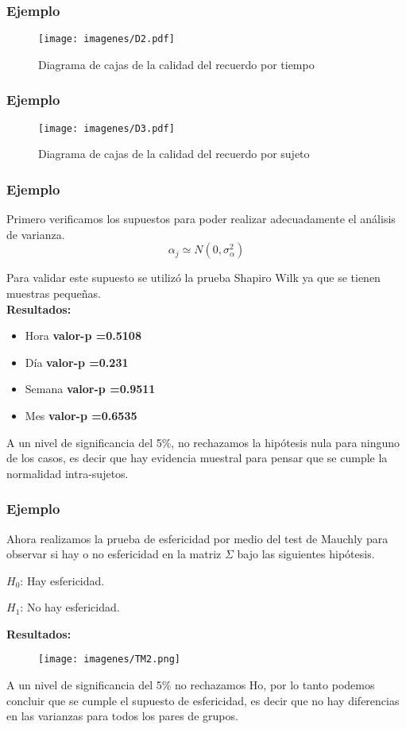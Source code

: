 \documentclass[12pt]{beamer}
\begin{document}
\begin{frame}
\frametitle{Ejemplo}
\begin{figure}[h!]
\caption{Diagrama de cajas de la calidad del recuerdo por tiempo}
  \centering
  \texttt{[image: imagenes/D2.pdf]}
\end{figure}
\end{frame}

\begin{frame}
\frametitle{Ejemplo}
\begin{figure}[h!]
\caption{Diagrama de cajas de la calidad del recuerdo por sujeto}
  \centering
  \texttt{[image: imagenes/D3.pdf]}
\end{figure}
\end{frame}

\begin{frame}
\frametitle{Ejemplo}
Primero verificamos los supuestos para poder realizar adecuadamente el análisis de varianza. 
 $$\alpha_j \simeq N(0,\sigma^2_\alpha)$$

Para validar este supuesto se utilizó la prueba Shapiro Wilk ya que se tienen muestras pequeñas.
~\\\textbf{Resultados:}
\begin{itemize}
\item[]Hora \textbf{valor-p =0.5108}
\item[]Día \textbf{valor-p =0.231}
\item[]Semana \textbf{valor-p =0.9511}
\item[]Mes \textbf{valor-p =0.6535}
\end{itemize}
A un nivel de significancia del 5\%, no rechazamos la hipótesis nula para ninguno de los casos, es
decir que hay evidencia muestral para pensar que se cumple la normalidad intra-sujetos.
\end{frame}

\begin{frame}
\frametitle{Ejemplo}
Ahora realizamos la prueba de esfericidad por medio del test de Mauchly para observar si hay o no
esfericidad en la matriz $\Sigma$ bajo las siguientes hipótesis.
\begin{center}
$H_0$: Hay esfericidad.

$H_1$: No hay esfericidad.
\end{center}
\textbf{Resultados:}
\begin{figure}[h!]
  \centering
  \texttt{[image: imagenes/TM2.png]}
\end{figure}
A un nivel de significancia del 5\% no rechazamos Ho, por lo tanto podemos concluir que se cumple
el supuesto de esfericidad, es decir que no hay diferencias en las varianzas para todos los pares
de grupos.
\end{frame}
\end{document}
